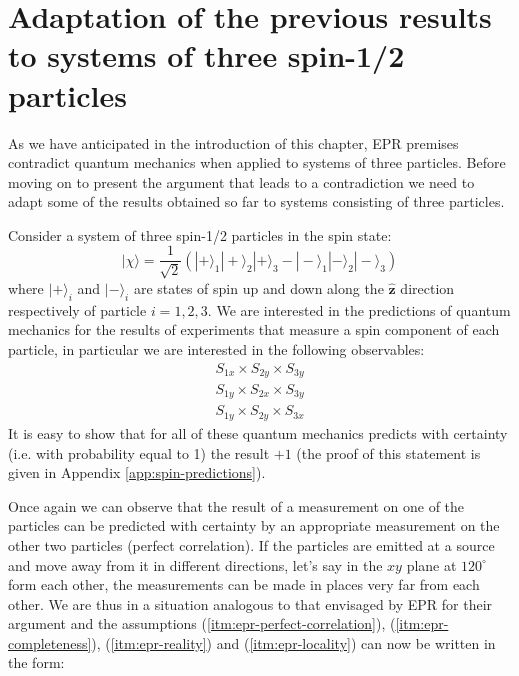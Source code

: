 \section{Adaptation of the previous results to systems of three spin-1/2 particles}
\label{sec:adaptation-to-3-particles}
As we have anticipated in the introduction of this chapter, EPR premises contradict quantum mechanics when applied to systems of three particles. Before moving on to present the argument that leads to a contradiction we need to adapt some of the results obtained so far to systems consisting of three particles.

Consider a system of three spin-1/2 particles in the spin state:
\begin{equation}
  |\chi\rangle = \frac{1}{\sqrt{2}} \left( |+\rangle_1 |+\rangle_2 |+\rangle_3 - |-\rangle_1 |-\rangle_2 |-\rangle_3 \right)
  \label{eq:ghz-state}
\end{equation}
where $|+\rangle_i$ and $|-\rangle_i$ are states of spin up and down along the $\mathbf{\hat{z}}$ direction respectively of particle $i = 1, 2, 3$.
We are interested in the predictions of quantum mechanics for the results of experiments that measure a spin component of each particle, in particular we are interested in the following observables:
\begin{equation}
  \begin{split}
    S_{1x} \times S_{2y} \times S_{3y}\\
    S_{1y} \times S_{2x} \times S_{3y}\\
    S_{1y} \times S_{2y} \times S_{3x}
  \end{split}
  \label{eq:xyy-observables}
\end{equation}
It is easy to show that for all of these quantum mechanics predicts with certainty (i.e. with probability equal to 1) the result $+ 1$ (the proof of this statement is given in Appendix \ref{app:spin-predictions}).

Once again we can observe that the result of a measurement on one of the particles can be predicted with certainty by an appropriate measurement on the other two particles (perfect correlation). If the particles are emitted at a source and move away from it in different directions, let's say in the $xy$ plane at $120^{\circ}$ form each other, the measurements can be made in places very far from each other. We are thus in a situation analogous to that envisaged by EPR for their argument and the assumptions (\ref{itm:epr-perfect-correlation}), (\ref{itm:epr-completeness}), (\ref{itm:epr-reality}) and (\ref{itm:epr-locality}) can now be written in the form:%

